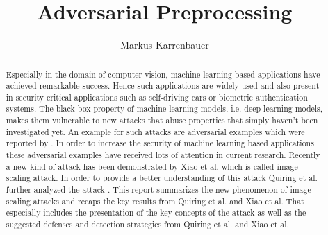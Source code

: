 \documentclass[sigconf]{acmart}
\begin{document}
\title{Adversarial Preprocessing}

\author{Markus Karrenbauer}

\renewcommand{\shortauthors}{Karrenbauer}

\begin{abstract}
Especially in the domain of computer vision, machine learning based applications have achieved remarkable success.
Hence such applications are widely used and also present in security critical applications such as self-driving cars or biometric authentication systems.
The black-box property of machine learning models, i.e. deep learning models, makes them vulnerable to new attacks that abuse properties that simply haven't been investigated yet.
An example for such attacks are adversarial examples which were reported by \cite{intr}.
In order to increase the security of machine learning based applications these adversarial examples have received lots of attention in current research.
Recently a new kind of attack has been demonstrated by Xiao et al.\cite{camouflage} which is called image-scaling attack.
In order to provide a better understanding of this attack Quiring et al. further analyzed the attack \cite{imgscale, imgscalepoison}.
This report summarizes the new phenomenon of image-scaling attacks and recaps the key results from Quiring et al. and Xiao et al.
That especially includes the presentation of the key concepts of the attack as well as the suggested defenses and detection strategies from Quiring et al. and Xiao et al.
\end{abstract}
\end{document}

